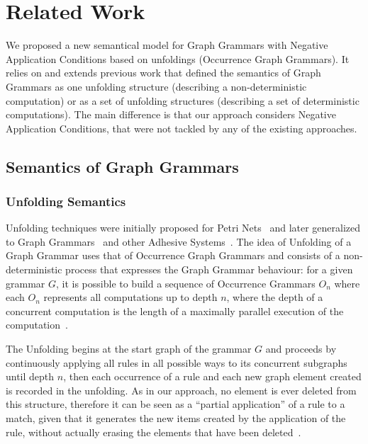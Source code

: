 \chapter{Related Work}\label{ch:related-work}

We proposed a new semantical model for Graph Grammars with Negative Application Conditions based on unfoldings (Occurrence Graph Grammars). It relies on and extends previous work that defined the semantics of Graph Grammars as one unfolding structure (describing a non-deterministic computation) or as a set of unfolding structures (describing  a set of deterministic computations). The main difference is that our approach considers Negative Application Conditions, that were not tackled by any of the existing approaches.

\section{Semantics of Graph Grammars}

\subsection{Unfolding Semantics}

  Unfolding techniques were initially proposed for Petri Nets~\cite{Nielsen1981} and later generalized to Graph Grammars~\cite{Ribeiro1996} and other Adhesive Systems~\cite{Baldan2009}.
  The idea of Unfolding of a Graph Grammar uses that of Occurrence Graph Grammars and consists of a non-deterministic process that expresses the Graph Grammar behaviour: for a given grammar $G$, it is possible to build a sequence of Occurrence Grammars $O_n$ where each $O_n$ represents all computations up to depth $n$, where the depth of a concurrent computation is the length of a maximally parallel execution of the computation~\cite{Baldan2009}.

  The Unfolding begins at the start graph of the grammar $G$ and proceeds by continuously applying all rules in all possible ways to its concurrent subgraphs until depth $n$, then each occurrence of a rule and each new graph element created is recorded in the unfolding.
  As in our approach, no element is ever deleted from this structure, therefore it can be seen as a ``partial application'' of a rule to a match, given that it generates the new items created by the application of the rule, without actually erasing the elements that have been deleted~\cite{Baldan2008}.%

